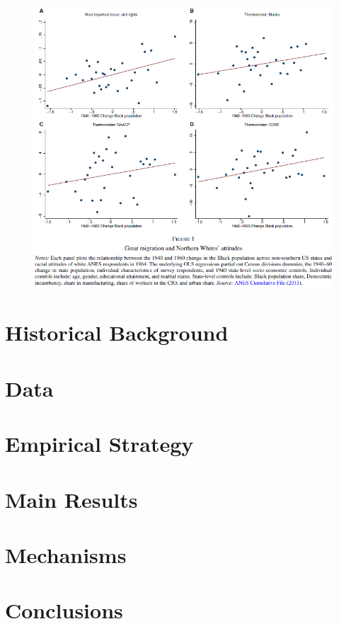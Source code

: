 \documentclass[dvipdfmx,11pt]{beamer}
\begin{document}
\begin{frame}{}
  \begin{figure}
    \centering
    \includegraphics[scale = .45]{fig_tab/os20220708/F1.png}
  \end{figure}
\end{frame}

\section{Historical Background}
\frame{\sectionpage}

\section{Data}
\frame{\sectionpage}

\section{Empirical Strategy}
\frame{\sectionpage}

\section{Main Results}
\frame{\sectionpage}

\section{Mechanisms}
\frame{\sectionpage}

\section{Conclusions}
\frame{\sectionpage}
\end{document}
